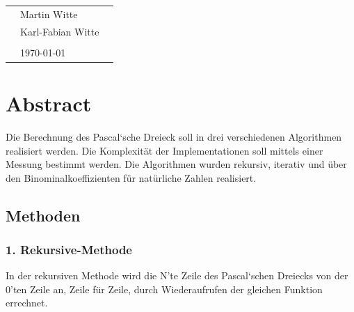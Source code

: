 \documentclass[
   draft=false
  ,paper=a4
  ,twoside=false
  ,fontsize=11pt
  ,headsepline
  ,DIV11
  ,parskip=full+
]{scrartcl} %
\begin{document}
\def\titel{AD Praktikum: Aufgabe 04, Pascals Dreieck}


\def\teilnehmer{ 
	& Martin Witte & \\
    & Karl-Fabian Witte   & \\
}




\newlength{\txtw} %
\setlength{\txtw}{\textwidth} %
\addtolength{\txtw}{-10\tabcolsep} %

\def\me{\myName \newline \footnotesize{\url{\myEmail} } }

\begin{tabular}{l p{0.4\txtw} p{0.4\txtw} }
	\teilnehmer
	& & \\
	& \today & \\
\end{tabular}

\section*{Abstract}
\centering
Die Berechnung des Pascal`sche Dreieck soll in drei verschiedenen Algorithmen realisiert werden. Die \mbox{Komplexität} der Implementationen soll mittels einer Messung bestimmt werden. Die Algorithmen wurden rekursiv, iterativ und über den Binominalkoeffizienten für natürliche Zahlen realisiert.  

\normalsize
\subsection*{Methoden}

\subsubsection*{1. Rekursive-Methode}
\flushleft
In der rekursiven Methode wird die N'te Zeile des Pascal`schen Dreiecks von der 0'ten Zeile an, Zeile für Zeile, durch Wiederaufrufen der gleichen Funktion errechnet.
\end{document}

